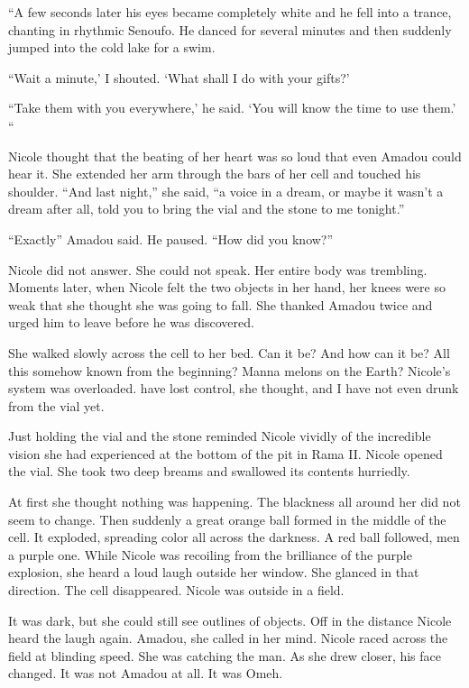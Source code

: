 \documentclass[]{article}
\begin{document}
{{“A few seconds later his eyes became completely white and he fell into a trance, chanting in rhythmic Senoufo.  He danced for several minutes and then suddenly jumped into the cold lake for a swim.

“Wait a minute,’ I shouted.  ‘What shall I do with your gifts?’

“Take them with you everywhere,’ he said.  ‘You will know the time to use them.’ “

Nicole thought that the beating of her heart was so loud that even Amadou could hear it.  She extended her arm through the bars of her cell and touched his shoulder.  “And last night,” she said, “a voice in a dream, or maybe it wasn’t a dream after all, told you to bring the vial and the stone to me tonight.”

“Exactly” Amadou said.  He paused.  “How did you know?”

Nicole did not answer.  She could not speak.  Her entire body was trembling.  Moments later, when Nicole felt the two objects in her hand, her knees were so weak that she thought she was going to fall.  She thanked Amadou twice and urged him to leave before he was discovered.

She walked slowly across the cell to her bed.  Can it be? And how can it be? All this somehow known from the beginning? Manna melons on the Earth? Nicole’s system was overloaded.  have lost control, she thought, and I have not even drunk from the vial yet.

Just holding the vial and the stone reminded Nicole vividly of the incredible vision she had experienced at the bottom of the pit in Rama II.  Nicole opened the vial.  She took two deep breams and swallowed its contents hurriedly.

At first she thought nothing was happening.  The blackness all around her did not seem to change.  Then suddenly a great orange ball formed in the middle of the cell.  It exploded, spreading color all across the darkness.  A red ball followed, men a purple one.  While Nicole was recoiling from the brilliance of the purple explosion, she heard a loud laugh outside her window.  She glanced in that direction.  The cell disappeared.  Nicole was outside in a field.

It was dark, but she could still see outlines of objects.  Off in the distance Nicole heard the laugh again.  Amadou, she called in her mind.  Nicole raced across the field at blinding speed.  She was catching the man.  As she drew closer, his face changed.  It was not Amadou at all.  It was Omeh.

}}
\end{document}
